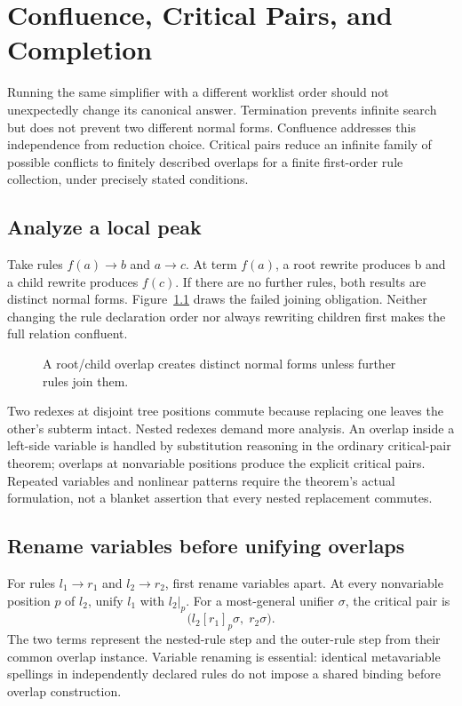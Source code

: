 \chapter{Confluence, Critical Pairs, and Completion}
\label{ch:rewrite-confluence}

Running the same simplifier with a different worklist order should not unexpectedly change its canonical answer.
Termination prevents infinite search but does not prevent two different normal forms.
Confluence addresses this independence from reduction choice.
Critical pairs reduce an infinite family of possible conflicts to finitely described overlaps for a finite first-order rule collection, under precisely stated conditions.

\section{Analyze a local peak}
\label{sec:ch84-peak}
Take rules $f(a)\to b$ and $a\to c$.
At term $f(a)$, a root rewrite produces b and a child rewrite produces $f(c)$.
If there are no further rules, both results are distinct normal forms.
Figure~\ref{fig:ch84-peak} draws the failed joining obligation.
Neither changing the rule declaration order nor always rewriting children first makes the full relation confluent.

\begin{figure}[htbp]
\centering
{}
\caption{A root/child overlap creates distinct normal forms unless further rules join them.}
\label{fig:ch84-peak}
\end{figure}

Two redexes at disjoint tree positions commute because replacing one leaves the other's subterm intact.
Nested redexes demand more analysis.
An overlap inside a left-side variable is handled by substitution reasoning in the ordinary critical-pair theorem; overlaps at nonvariable positions produce the explicit critical pairs.
Repeated variables and nonlinear patterns require the theorem's actual formulation, not a blanket assertion that every nested replacement commutes.

\section{Rename variables before unifying overlaps}
\label{sec:ch84-enumeration}
For rules $l_1\to r_1$ and $l_2\to r_2$, first rename variables apart.
At every nonvariable position $p$ of $l_2$, unify $l_1$ with $l_2|_p$.
For a most-general unifier $\sigma$, the critical pair is
\[
 \bigl(l_2[r_1]_p\sigma,\;r_2\sigma\bigr).
\]
The two terms represent the nested-rule step and the outer-rule step from their common overlap instance.
Variable renaming is essential: identical metavariable spellings in independently declared rules do not impose a shared binding before overlap construction.

